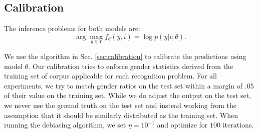 \subsection{Calibration}
The inference problems for both models are: $$\arg\max_{y\in Y} f_\theta(y, i) = \log p(y|i; \theta).$$ 

We use the algorithm  in Sec. \eqref{sec:calibration} to calibrate the predictions using model $\theta$.
Our calibration tries to enforce gender statistics derived from the training set of corpus applicable for each recognition problem. 
For all experiments, we try to match gender ratios on the test set within a margin of $.05$ of their value on the training set. 
While we do adjust the output on the test set, we never use the ground truth on the test set and instead working from the assumption that it should be similarly distributed as the training set.
When running the debiasing algorithm, we set $\eta = 10^{-1}$ and optimize for $100$ iterations.
